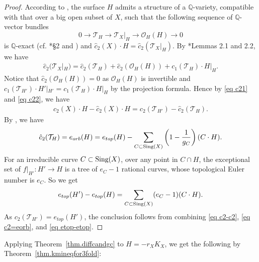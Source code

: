 \documentclass[12pt,twoside]{amsart}
\theoremstyle{definition}
\begin{document}
\begin{proof}
According to \cite[Proposition~3.11]{GrebKebekusPeternellTaji2019a}, the surface $H$ admits a structure of a $\mathbb{Q}$-variety, compatible with that over a big open subset of $X$, such that the following sequence of $\mathbb{Q}$-vector bundles 
 \[
 0\to \mathcal T_H\to \mathcal T_X|_H\to \mathcal O_H(H)\to 0
 \]
 is $\mathbb{Q}$-exact (cf. \cite{Kawamata1992a}*{\S 2} and \cite[Construction 3.8]{GrebKebekusPeternellTaji2019a}) and $\hat c_2(X)\cdot H=\hat c_2(\mathcal T_X|_H)$. By \cite{Kawamata1992a}*{Lemmas 2.1 and 2.2}, we have 
\begin{align}
 \hat c_2(\mathcal T_X|_H)=\hat c_2(\mathcal T_H)+\hat c_2(\mathcal O_H(H)) + c_1(\mathcal T_{H})\cdot H|_H.
\label{eq c22}
 \end{align} 
 Notice that $\hat c_2(\mathcal O_H(H))=0$ as $\mathcal{O}_H(H)$ is invertible and $c_1(\mathcal T_{H'})\cdot H'|_{H'}=c_1(\mathcal T_{H})\cdot H|_H$ by the projection formula. Hence by \eqref{eq c21} and \eqref{eq c22}, we have
 \begin{align}\label{eq c2-c2}
 c_2(X)\cdot H-\hat c_2(X)\cdot H=c_2(\mathcal T_{H'})-\hat c_2(\mathcal T_H).
 \end{align}
 By \cite[{Definition~10.7, Theorem~10.8}]{1992}, we have 
 \begin{align}\label{eq c2=eorb}
 \hat c_2(\mathcal T_H)=e_{orb}(H)=e_{top}(H)-\sum_{C\subset \text{\rm Sing}(X)}\left(1-\frac{1}{g_C}\right)(C \cdot H).
 \end{align}
 For an irreducible curve ${C\subset \text{\rm Sing}(X)}$, over any point in $C\cap H$, the exceptional set of $f|_{H'}\colon H'\to H$ is a tree of $e_C-1$ rational curves, whose topological Euler number is $e_C$. So we get
 \begin{align}\label{eq etop-etop}
e_{top}(H')-e_{top}(H)=\sum_{C\subset \text{\rm Sing}(X)}(e_C-1)(C \cdot H).
 \end{align}
 As $c_2(\mathcal T_{H'})=e_{top}(H')$, the conclusion follows from combining \eqref{eq c2-c2}, \eqref{eq c2=eorb}, and \eqref{eq etop-etop}.
\end{proof}

Applying Theorem~\ref{thm.diffcandgc} to $H=-r_XK_X$, we get the following by Theorem~\ref{thm.kmineqfor3fold}: %
\end{document}
